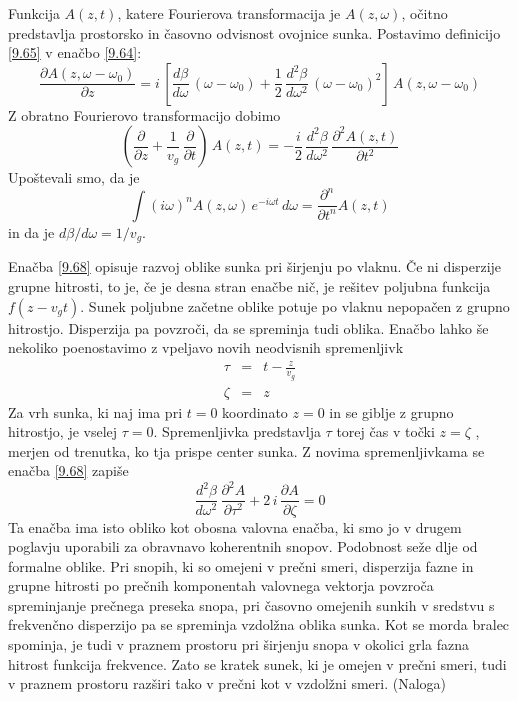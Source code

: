 \documentclass[11pt,fleqn]{book} %
\begin{document}
 Funkcija $A\left(z,t\right)$, katere Fourierova transformacija je
$A\left(z,\omega\right)$, očitno predstavlja prostorsko in časovno
odvisnost ovojnice sunka. Postavimo definicijo \ref{9.65} v enačbo
\ref{9.64}: 
\begin{equation}
\frac{\partial A\left(z,\omega-\omega_{0}\right)}{\partial z}=i\,\left[\frac{d\beta}{d\omega}\,\left(\omega-\omega_{0}\right)+\frac{1}{2}\,\frac{d^{2}\beta}{d\omega^{2}}\,\left(\omega-\omega_{0}\right)^{2}\right]\, A\left(z,\omega-\omega_{0}\right)\label{9.67}
\end{equation}
 Z obratno Fourierovo transformacijo dobimo 
\begin{equation}
\left(\frac{\partial}{\partial z}+\frac{1}{v_{g}}\,\frac{\partial}{\partial t}\right)\, A\left(z,t\right)=-\frac{i}{2}\,\frac{d^{2}\beta}{d\omega^{2}}\,\frac{\partial^{2}A\left(z,t\right)}{\partial t^{2}}\label{9.68}
\end{equation}
 Upoštevali smo, da je 
\begin{equation}
\int\left(i\omega\right)^{n}A\left(z,\omega\right)\, e^{-i\omega t}\, d\omega=\frac{\partial^{n}}{\partial t^{n}}A\left(z,t\right)\label{9.69}
\end{equation}
 in da je $d\beta/d\omega=1/v_{g}$.

Enačba \ref{9.68} opisuje razvoj oblike sunka pri širjenju po vlaknu.
Če ni disperzije grupne hitrosti, to je, če je desna stran enačbe
nič, je rešitev poljubna funkcija $f\left(z-v_{g}t\right)$. Sunek
poljubne začetne oblike potuje po vlaknu nepopačen z grupno hitrostjo.
Disperzija pa povzroči, da se spreminja tudi oblika. Enačbo lahko
še nekoliko poenostavimo z vpeljavo novih neodvisnih spremenljivk
\begin{eqnarray}
\tau & = & t-\frac{z}{v_{g}}\nonumber \\
\zeta & = & z\label{9.70}
\end{eqnarray}
 Za vrh sunka, ki naj ima pri $t=0$ koordinato $z=0$ in se giblje
z grupno hitrostjo, je vselej $\tau=0$. Spremenljivka predstavlja
$\tau$ torej čas v točki $z=\zeta$ , merjen od trenutka, ko tja
prispe center sunka. Z novima spremenljivkama se enačba \ref{9.68}
zapiše 
\begin{equation}
\frac{d^{2}\beta}{d\omega^{2}}\,\frac{\partial^{2}A}{\partial\tau^{2}}+2\, i\,\frac{\partial A}{\partial\zeta}=0\label{9.71}
\end{equation}
 Ta enačba ima isto obliko kot obosna valovna enačba, ki smo jo v
drugem poglavju uporabili za obravnavo koherentnih snopov. Podobnost
seže dlje od formalne oblike. Pri snopih, ki so omejeni v prečni smeri,
disperzija fazne in grupne hitrosti po prečnih komponentah valovnega
vektorja povzroča spreminjanje prečnega preseka snopa, pri časovno
omejenih sunkih v sredstvu s frekvenčno disperzijo pa se spreminja
vzdolžna oblika sunka. Kot se morda bralec spominja, je tudi v praznem
prostoru pri širjenju snopa v okolici grla fazna hitrost funkcija
frekvence. Zato se kratek sunek, ki je omejen v prečni smeri, tudi
v praznem prostoru razširi tako v prečni kot v vzdolžni smeri. (Naloga)
\end{document}
